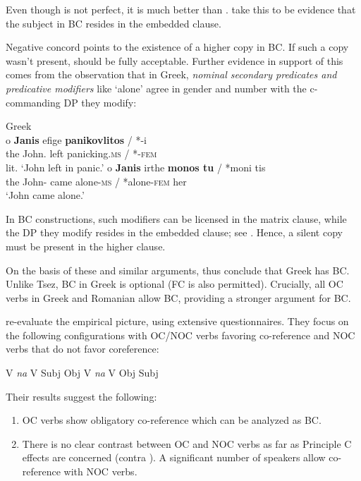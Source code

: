 \documentclass[output=paper]{langsci/langscibook}
\begin{document}
Even though  is not perfect, it is much better than . \citet{Alexiadou2010} take this to be evidence that the subject in BC resides in the embedded clause. 

Negative concord points to the existence of a higher copy in BC. If such a copy wasn’t present,  should be fully acceptable. Further evidence in support of this comes from the observation that in Greek, \textit{nominal secondary predicates and predicative modifiers} like ‘alone’ agree in gender and number with the c-commanding DP they modify:

\ea%
    \label{ex:alexiadou:13}
    Greek\\
\ea \gll  o    \textbf{Janis}        efige  \textbf{panikovlitos} / *-i      \\
             the John.{\NOM}  left    panicking.\textsc{ms} / *-\textsc{fem}\\ 
    \glt        lit. ‘John left in panic.’
\ex \gll o    \textbf{Janis}         irthe   \textbf{monos tu} / *moni tis\\
               the John-{\NOM}  came   alone-\textsc{ms} / *alone-\textsc{fem} her\\
    \glt       ‘John came alone.’  
    \z
\z


In BC constructions, such modifiers can be licensed in the matrix clause, while the DP they modify resides in the embedded clause; see \citealt[103--104, examples (36--38)]{Alexiadou2010}. Hence, a silent copy must be present in the higher clause. 

On the basis of these and similar arguments, \citet{Alexiadou2010} thus conclude that Greek has BC. Unlike Tsez, BC in Greek is optional (FC is also permitted). Crucially, all OC verbs in Greek and Romanian allow BC, providing a stronger argument for BC.

\citet{Tsakali2017} re-evaluate the empirical picture, using extensive questionnaires. They focus on the following configurations with OC\slash NOC verbs favoring co-reference and NOC verbs that do not favor coreference:


\ea%
    \label{ex:alexiadou:14}
    \ea V \textit{na} V Subj Obj
    \ex V \textit{na} V Obj Subj
    \z
\z

Their results suggest the following:

\begin{enumerate}
\item OC verbs show obligatory co-reference which can be analyzed as BC.
\item There is no clear contrast between OC and NOC verbs as far as Principle C effects are concerned (contra \citealt{Alexiadou2010}). A significant number of speakers allow co-reference with NOC verbs. 
\end{enumerate}
\end{document}
